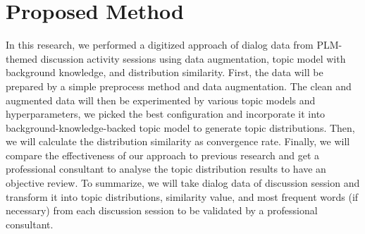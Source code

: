 \documentclass[10pt, conference, compsocconf]{IEEEtran}
\begin{document}



\section{Proposed Method}
\label{sec_pm}
In this research, we performed a digitized approach of dialog data from PLM-themed discussion activity sessions using data augmentation, topic model with background knowledge, and distribution similarity. First, the data will be prepared by a simple preprocess method and data augmentation. The clean and augmented data will then be experimented by various topic models and hyperparameters, we picked the best configuration and incorporate it into background-knowledge-backed topic model to generate topic distributions. Then, we will calculate the distribution similarity as convergence rate. Finally, we will compare the effectiveness of our approach to previous research and get a professional consultant to analyse the topic distribution results to have an objective review. To summarize, we will take dialog data of discussion session and transform it into topic distributions, similarity value, and most frequent words (if necessary) from each discussion session to be validated by a professional consultant.
\end{document}
